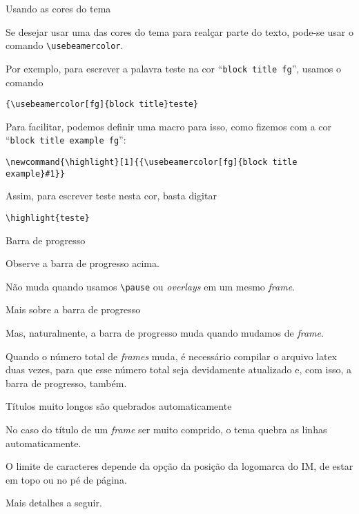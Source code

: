 \documentclass{beamer}
\newcommand{\highlight}[1]{{\usebeamercolor[fg]{block title example}#1}}
\begin{document}
\begin{frame}[fragile]{Usando as cores do tema}

  Se desejar usar uma das cores do tema para realçar parte do texto, pode-se usar o comando {\small\verb|\usebeamercolor|}.
  \medskip

  Por exemplo, para escrever a palavra {teste} na cor ``\texttt{block title fg}'', usamos o comando

  \begin{center}
    {\small\verb|{\usebeamercolor[fg]{block title}teste}|}
  \end{center}

  Para facilitar, podemos definir uma macro para isso, como fizemos com a cor ``\texttt{block title example fg}'':
 
  \begin{center}
    {\footnotesize\verb|\newcommand{\highlight}[1]{{#1}}|}
  \end{center}

  Assim, para escrever \highlight{teste} nesta cor, basta digitar

  \begin{center}
    {\small\verb|\highlight{teste}|}
  \end{center}
\end{frame}

\begin{frame}[fragile]{Barra de progresso}

  Observe a barra de progresso acima.
  \pause
  
  \bigskip
  Não muda quando usamos {\verb|\pause|} ou \emph{overlays} em um mesmo \emph{frame}.

\end{frame}

\begin{frame}{Mais sobre a barra de progresso}

  Mas, naturalmente, a barra de progresso muda quando mudamos de \emph{frame}.
  
  \bigskip
  Quando o número total de \emph{frames} muda, é necessário compilar o arquivo latex duas vezes, para que esse número total seja devidamente atualizado e, com isso, a barra de progresso, também.

\end{frame}

\begin{frame}{Títulos muito longos são quebrados automaticamente} 
  
  No caso do título de um \emph{frame} ser muito comprido, o tema quebra as linhas automaticamente.
  \medskip

  O limite de caracteres depende da opção da posição da logomarca do IM, de estar em topo ou no pé de página.
  \medskip

  Mais detalhes a seguir.

\end{frame}
\end{document}
